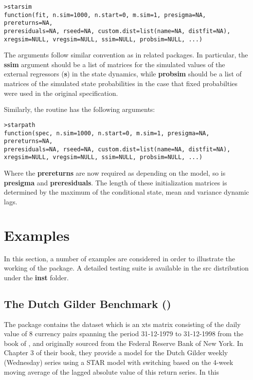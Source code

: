 \begin{lstlisting}
>starsim
function(fit, n.sim=1000, n.start=0, m.sim=1, presigma=NA, prereturns=NA, 
preresiduals=NA, rseed=NA, custom.dist=list(name=NA, distfit=NA), 
xregsim=NULL, vregsim=NULL, ssim=NULL, probsim=NULL, ...)
\end{lstlisting}
The arguments follow similar convention as in related packages. In particular,
the \textbf{ssim} argument should be a list of matrices for the
simulated values of the external regressors (\textbf{s}) in the state dynamics,
while \textbf{probsim} should be a list of matrices of the simulated state
probabilities in the case that fixed probabilties were used in the original
specification.

Similarly, the  routine has the following arguments:
\begin{lstlisting}
>starpath
function(spec, n.sim=1000, n.start=0, m.sim=1, presigma=NA, prereturns=NA, 
preresiduals=NA, rseed=NA, custom.dist=list(name=NA, distfit=NA), 
xregsim=NULL, vregsim=NULL, ssim=NULL, probsim=NULL, ...)
\end{lstlisting}
Where the \textbf{prereturns} are now required as depending on the model, so is
\textbf{presigma} and \textbf{preresiduals}. The length of these initialization
matrices is determined by the maximum of the conditional state, mean and
variance dynamic lags.

\section{Examples}\label{sec:6}
In this section, a number of examples are considered in order to illustrate the
working of the package. A detailed testing suite is available in the src
distribution under the \textbf{inst} folder.

\subsection{The Dutch Gilder Benchmark (\cite{Franses2000})}
The package contains the  dataset which is an xts matrix
consisting of the daily value of 8 currency pairs spanning the period
31-12-1979 to 31-12-1998 from the book of \cite{Franses2000}, and originally
sourced from the Federal Reserve Bank of New York. In Chapter 3 of their book,
they provide a model for the Dutch Gilder weekly (Wednesday) series using a STAR
model with switching based on the 4-week moving average of the lagged absolute
value of this return series.
In this
